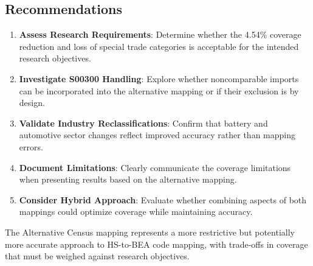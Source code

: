 \documentclass[11pt]{article}
\begin{document}
\subsection{Recommendations}

\begin{enumerate}
\item \textbf{Assess Research Requirements}: Determine whether the 4.54\% coverage reduction and loss of special trade categories is acceptable for the intended research objectives.

\item \textbf{Investigate S00300 Handling}: Explore whether noncomparable imports can be incorporated into the alternative mapping or if their exclusion is by design.

\item \textbf{Validate Industry Reclassifications}: Confirm that battery and automotive sector changes reflect improved accuracy rather than mapping errors.

\item \textbf{Document Limitations}: Clearly communicate the coverage limitations when presenting results based on the alternative mapping.

\item \textbf{Consider Hybrid Approach}: Evaluate whether combining aspects of both mappings could optimize coverage while maintaining accuracy.
\end{enumerate}

The Alternative Census mapping represents a more restrictive but potentially more accurate approach to HS-to-BEA code mapping, with trade-offs in coverage that must be weighed against research objectives.
\end{document}
